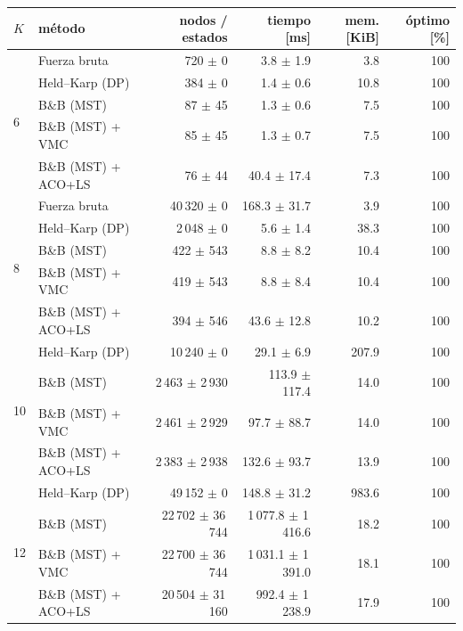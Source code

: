 \begin{tabular}{llrrrr}
\toprule
$K$ & método & nodos / estados & tiempo [ms] & mem. [KiB] & óptimo [\%] \\
\midrule
\multirow{5}{*}{6} & Fuerza bruta & 720 $\pm$ 0 & 3.8 $\pm$ 1.9 & 3.8 & 100 \\
 & Held--Karp (DP) & 384 $\pm$ 0 & 1.4 $\pm$ 0.6 & 10.8 & 100 \\
 & B\&B (MST) & 87 $\pm$ 45 & 1.3 $\pm$ 0.6 & 7.5 & 100 \\
 & B\&B (MST) + VMC & 85 $\pm$ 45 & 1.3 $\pm$ 0.7 & 7.5 & 100 \\
 & B\&B (MST) + ACO+LS & 76 $\pm$ 44 & 40.4 $\pm$ 17.4 & 7.3 & 100 \\
\midrule
\multirow{5}{*}{8} & Fuerza bruta & 40\,320 $\pm$ 0 & 168.3 $\pm$ 31.7 & 3.9 & 100 \\
 & Held--Karp (DP) & 2\,048 $\pm$ 0 & 5.6 $\pm$ 1.4 & 38.3 & 100 \\
 & B\&B (MST) & 422 $\pm$ 543 & 8.8 $\pm$ 8.2 & 10.4 & 100 \\
 & B\&B (MST) + VMC & 419 $\pm$ 543 & 8.8 $\pm$ 8.4 & 10.4 & 100 \\
 & B\&B (MST) + ACO+LS & 394 $\pm$ 546 & 43.6 $\pm$ 12.8 & 10.2 & 100 \\
\midrule
\multirow{4}{*}{10} & Held--Karp (DP) & 10\,240 $\pm$ 0 & 29.1 $\pm$ 6.9 & 207.9 & 100 \\
 & B\&B (MST) & 2\,463 $\pm$ 2\,930 & 113.9 $\pm$ 117.4 & 14.0 & 100 \\
 & B\&B (MST) + VMC & 2\,461 $\pm$ 2\,929 & 97.7 $\pm$ 88.7 & 14.0 & 100 \\
 & B\&B (MST) + ACO+LS & 2\,383 $\pm$ 2\,938 & 132.6 $\pm$ 93.7 & 13.9 & 100 \\
\midrule
\multirow{4}{*}{12} & Held--Karp (DP) & 49\,152 $\pm$ 0 & 148.8 $\pm$ 31.2 & 983.6 & 100 \\
 & B\&B (MST) & 22\,702 $\pm$ 36\,744 & 1\,077.8 $\pm$ 1\,416.6 & 18.2 & 100 \\
 & B\&B (MST) + VMC & 22\,700 $\pm$ 36\,744 & 1\,031.1 $\pm$ 1\,391.0 & 18.1 & 100 \\
 & B\&B (MST) + ACO+LS & 20\,504 $\pm$ 31\,160 & 992.4 $\pm$ 1\,238.9 & 17.9 & 100 \\
\bottomrule
\end{tabular}
